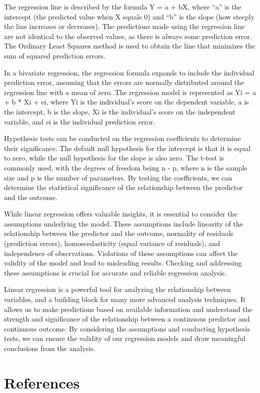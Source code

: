 \documentclass[
  letterpaper,
]{scrbook}
\newlength{\cslhangindent}
\newlength{\cslentryspacingunit} %
\newenvironment{CSLReferences}[2] %
 {%
  \setlength{\parindent}{0pt}
  \ifodd #1
  \let\oldpar\par
  \def\par{\hangindent=\cslhangindent\oldpar}
  \fi
  \setlength{\parskip}{#2\cslentryspacingunit}
 }%
 {}
\begin{document}
{The regression line is described by the formula Y = a + bX, where ``a''
is the intercept (the predicted value when X equals 0) and ``b'' is the
slope (how steeply the line increases or decreases). The predictions
made using the regression line are not identical to the observed values,
as there is always some prediction error. The Ordinary Least Squares
method is used to obtain the line that minimizes the sum of squared
prediction errors.

In a bivariate regression, the regression formula expands to include the
individual prediction error, assuming that the errors are normally
distributed around the regression line with a mean of zero. The
regression model is represented as Yi = a + b * Xi + ei, where Yi is the
individual's score on the dependent variable, a is the intercept, b is
the slope, Xi is the individual's score on the independent variable, and
ei is the individual prediction error.

Hypothesis tests can be conducted on the regression coefficients to
determine their significance. The default null hypothesis for the
intercept is that it is equal to zero, while the null hypothesis for the
slope is also zero. The t-test is commonly used, with the degrees of
freedom being n - p, where n is the sample size and p is the number of
parameters. By testing the coefficients, we can determine the
statistical significance of the relationship between the predictor and
the outcome.

While linear regression offers valuable insights, it is essential to
consider the assumptions underlying the model. These assumptions include
linearity of the relationship between the predictor and the outcome,
normality of residuals (prediction errors), homoscedasticity (equal
variance of residuals), and independence of observations. Violations of
these assumptions can affect the validity of the model and lead to
misleading results. Checking and addressing these assumptions is crucial
for accurate and reliable regression analysis.

Linear regression is a powerful tool for analyzing the relationship
between variables, and a building block for many more advanced analysis
techniques. It allows us to make predictions based on available
information and understand the strength and significance of the
relationship between a continuous predictor and continuous outcome. By
considering the assumptions and conducting hypothesis tests, we can
ensure the validity of our regression models and draw meaningful
conclusions from the analysis.

\cleardoublepage
{}
{}
\appendix

\hypertarget{references}{%
\chapter*{References}\label{references}}


\hypertarget{refs}{}
\begin{CSLReferences}{0}{0}
\end{CSLReferences}


\backmatter
\end{document}
